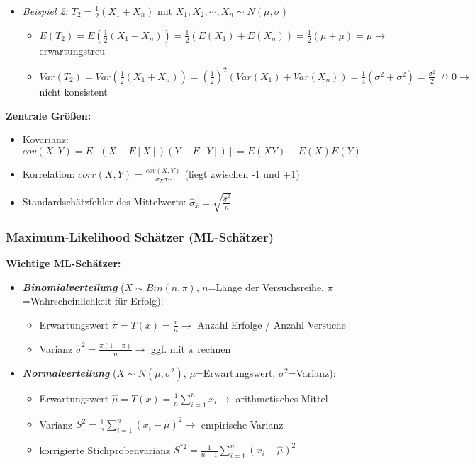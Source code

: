 \begin{itemize}
\begin{itemize}
    \end{itemize} 
    \item \emph{Beispiel 2:} \(T_2=\frac{1}{2}(X_1+X_n)\text{ mit }X_1, X_2, \cdots, X_n\sim N(\mu, \sigma)\)
    \begin{itemize}
        \item \(E(T_2)=E(\frac{1}{2}(X_1+X_n))=\frac{1}{2}(E(X_1)+E(X_n))=\frac{1}{2}(\mu+\mu)=\mu \rightarrow\) erwartungstreu
        \item \(Var(T_2)=Var(\frac{1}{2}(X_1+X_n))=\left(\frac{1}{2}\right)^2(Var(X_1)+Var(X_n))=\frac{1}{4}(\sigma^2+\sigma^2)=\frac{\sigma^2}{2} \nrightarrow  0 \rightarrow\) nicht konsistent 
    \end{itemize}
\end{itemize}

\textbf{Zentrale Größen:}
\begin{itemize}
    \item Kovarianz: \(cov(X,Y)=E[(X-E[X])(Y-E[Y])]=E(XY)-E(X)E(Y)\)
    \item Korrelation: \(corr(X,Y)=\frac{cov(X,Y)}{\sigma_X\sigma_Y}\) (liegt zwischen -1 und +1)
    \item Standardschätzfehler des Mittelwerts: \(\hat{\sigma}_{\bar{x}}=\sqrt{\frac{\hat{\sigma}^2}{n}}\)
\end{itemize}


\subsubsection{Maximum-Likelihood Schätzer (ML-Schätzer)}

\textbf{Wichtige ML-Schätzer:}

\begin{itemize}
    \item \textbf{\emph{Binomialverteilung}} (\(X\sim Bin(n, \pi)\), \(n\)=Länge der Versuchsreihe, \(\pi\)=Wahrscheinlichkeit für Erfolg):
    \begin{itemize}
        \item Erwartungswert \(\hat{\pi}=T(x)=\frac{x}{n} \rightarrow \) Anzahl Erfolge / Anzahl Versuche
        \item Varianz \(\hat{\sigma}^2=\frac{\pi(1-\pi)}{n} \rightarrow \) ggf. mit \(\hat{\pi}\) rechnen
    \end{itemize}
    \item \textbf{\emph{Normalverteilung}} (\(X\sim N(\mu, \sigma^2)\), \(\mu\)=Erwartungswert, \(\sigma^2\)=Varianz):
    \begin{itemize}
        \item Erwartungswert \(\hat{\mu}=T(x)=\frac{1}{n}\sum_{i=1}^{n}x_i \rightarrow \) arithmetisches Mittel
        \item Varianz \(S^2=\frac{1}{n}\sum_{i=1}^{n}(x_i-\hat{\mu})^2 \rightarrow \) empirische Varianz
        \item korrigierte Stichprobenvarianz \(S^{*2}=\frac{1}{n-1}\sum_{i=1}^{n}(x_i-\hat{\mu})^2 \)
    \end{itemize}
\end{itemize}


